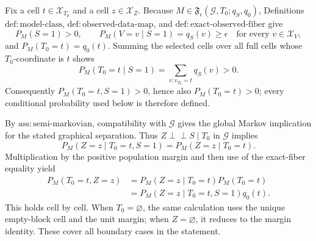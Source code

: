 Fix a cell \(t\in\mathcal X_{T_0}\) and a cell \(z\in\mathcal X_Z\).  Because \(M\in\mathfrak F_{\epsilon}(\mathcal G,T_0;q_S,q_0)\), Definitions \(\mathrm{def{:}model\text{-}class}\), \(\mathrm{def{:}observed\text{-}data\text{-}map}\), and \(\mathrm{def{:}exact\text{-}observed\text{-}fiber}\) give
\[
 P_M(S=1)>0,\qquad P_M(V=v\mid S=1)=q_S(v)\geq\epsilon
 \quad\text{for every }v\in\mathcal X_V,
\]
and \(P_M(T_0=t)=q_0(t)\).  Summing the selected cells over all full cells whose \(T_0\)-coordinate is \(t\) shows
\[
 P_M(T_0=t\mid S=1)
 =\sum_{v:v_{T_0}=t}q_S(v)>0.
\]
Consequently \(P_M(T_0=t,S=1)>0\), hence also \(P_M(T_0=t)>0\); every conditional probability used below is therefore defined.

By \(\mathrm{ass{:}semi\text{-}markovian}\), compatibility with \(\mathcal G\) gives the global Markov implication for the stated graphical separation.  Thus \(Z\perp\!\!\!\perp S\mid T_0\) in \(\mathcal G\) implies
\[
 P_M(Z=z\mid T_0=t,S=1)=P_M(Z=z\mid T_0=t).
\]
Multiplication by the positive population margin and then use of the exact-fiber equality yield
\[
 \begin{aligned}
 P_M(T_0=t,Z=z)
 &=P_M(Z=z\mid T_0=t)P_M(T_0=t)\\
 &=P_M(Z=z\mid T_0=t,S=1)q_0(t).
 \end{aligned}
\]
This holds cell by cell.  When \(T_0=\varnothing\), the same calculation uses the unique empty-block cell and the unit margin; when \(Z=\varnothing\), it reduces to the margin identity.  These cover all boundary cases in the statement.